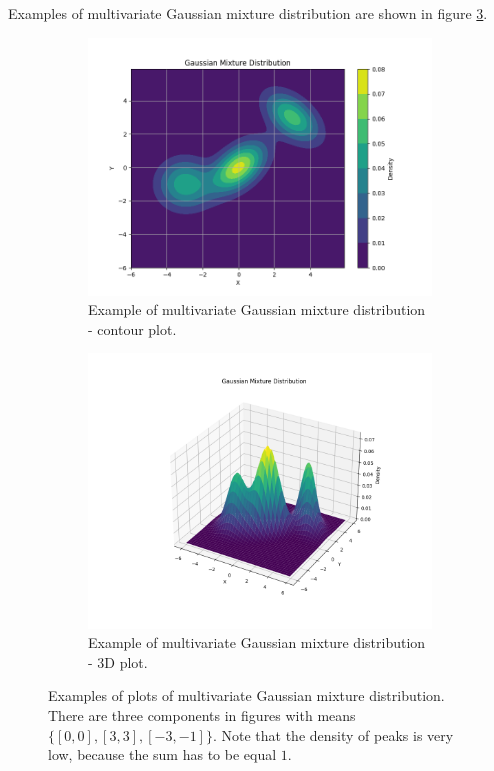 Examples of multivariate Gaussian mixture distribution are shown in figure \ref{fig:mvn_mixture_plot}.
\begin{figure}[htbp]
    \centering
    \begin{subfigure}[b]{0.45\textwidth}
        \centering
        \includegraphics[width=\textwidth]{text/chapter_01/imgs/mvn_mixture_contour}
        \caption{Example of multivariate Gaussian mixture distribution - contour plot.}
        \label{fig:mvn_mixture_contour}
    \end{subfigure}
    \hfill
    \begin{subfigure}[b]{0.45\textwidth}
        \centering
        \includegraphics[width=\textwidth]{text/chapter_01/imgs/mvn_mixture_3d}
        \caption{Example of multivariate Gaussian mixture distribution - 3D plot.}
        \label{fig:mvn_mixture_3d}
    \end{subfigure}
    \caption{Examples of plots of multivariate Gaussian mixture distribution. There are three components in figures with means $\{[0, 0], [3, 3], [-3, -1]\}$. Note that the density of peaks is very low, because the sum has to be equal $1$.}
    \label{fig:mvn_mixture_plot}
\end{figure}

